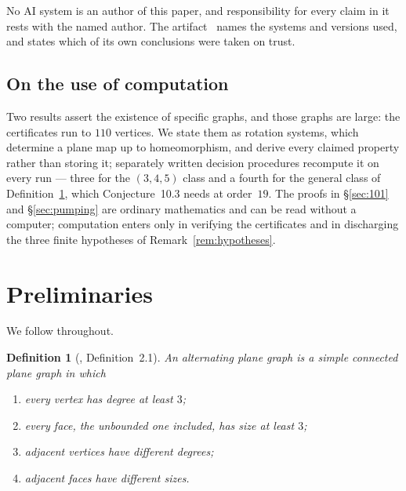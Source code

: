 \documentclass{baustms}
\theoremstyle{cupthm}
\theoremstyle{cupdefn}
\newtheorem{definition}[theorem]{Definition}
\theoremstyle{cuprem}
\begin{document}

No AI system is an author of this paper, and responsibility for every claim in
it rests with the named author. The artifact~\cite{artifact} names the systems
and versions used, and states which of its own conclusions were taken on trust.

\subsection*{On the use of computation}

Two results assert the existence of specific graphs, and those graphs are large:
the certificates run to $110$ vertices. We state them as rotation systems, which
determine a plane map up to homeomorphism, and derive every claimed property
rather than storing it; separately written decision procedures recompute it on
every run --- three for the $(3,4,5)$ class and a fourth for the general class of
Definition~\ref{def:apg}, which Conjecture~10.3 needs at order~$19$. The proofs
in \S\ref{sec:101} and \S\ref{sec:pumping} are ordinary mathematics and can be
read without a computer; computation enters only in verifying the certificates
and in discharging the three finite hypotheses of Remark~\ref{rem:hypotheses}.

\section{Preliminaries}\label{sec:prelim}

We follow \cite{AHSSV2015} throughout.

\begin{definition}[\cite{AHSSV2015}, Definition~2.1]\label{def:apg}
An \emph{alternating plane graph} is a simple connected plane graph in
which
\begin{enumerate}
  \item[(a)] every vertex has degree at least $3$;
  \item[(b)] every face, the unbounded one included, has size at least $3$;
  \item[(c)] adjacent vertices have different degrees;
  \item[(d)] adjacent faces have different sizes.
\end{enumerate}
\end{definition}
\end{document}
